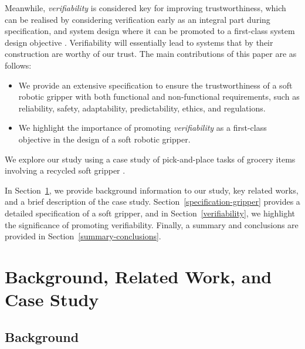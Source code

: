 \documentclass[lettersize,journal]{IEEEtran}
\begin{document}
Meanwhile, \emph{verifiability} is considered key for improving trustworthiness, which can be realised by considering verification early as an integral part during specification, and system design \cite{Mousavi2022} where it can be promoted to a first-class system design objective \cite{Eder2021}. 
Verifiability will essentially lead to systems that by their construction are worthy of our trust. 
The main contributions of this paper are as follows:
\begin{itemize}
	\item We provide an extensive specification to ensure the trustworthiness of a soft robotic gripper \cite{Partridge2022} with both functional and non-functional requirements, such as reliability, safety, adaptability, predictability, ethics, and regulations.
	\item We highlight the importance of promoting \emph{verifiability} as a first-class objective in the design of a soft robotic gripper. 
\end{itemize}
We explore our study using a case study of pick-and-place tasks of grocery items involving a recycled soft gripper \cite{Partridge2022}. 

In Section~\ref{background-relatedwork}, we provide background information to our study, key related works, and a brief description of the case study. %
Section~\ref{specification-gripper} provides a detailed specification of a soft gripper, and in Section~\ref{verifiability}, we highlight the significance of promoting verifiability.
Finally, a summary and conclusions are provided in Section~\ref{summary-conclusions}. 

\section{Background, Related Work, and Case Study}\label{background-relatedwork}

\subsection{Background}\label{background}
\end{document}
